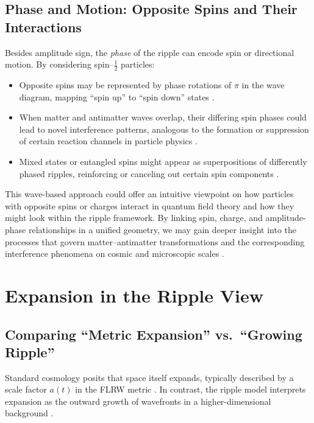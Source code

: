 \documentclass{article}
\begin{document}
\subsection{Phase and Motion: Opposite Spins and Their Interactions}
\label{subsec:phase-motion}
Besides amplitude sign, the \textit{phase} of the ripple can encode 
spin or directional motion. By considering spin--\(\tfrac{1}{2}\) 
particles:
\begin{itemize}
  \item Opposite spins may be represented by phase rotations of 
        \(\pi\) in the wave diagram, mapping ``spin up'' to ``spin down'' 
        states \cite{griffiths2005introduction, nielsenchuang2000}.
  \item When matter and antimatter waves overlap, their differing 
        spin phases could lead to novel interference patterns, 
        analogous to the formation or suppression of certain 
        reaction channels in particle physics \cite{Bell1964, hawking1988}.
  \item Mixed states or entangled spins might appear as superpositions 
        of differently phased ripples, reinforcing or canceling out 
        certain spin components \cite{everett1957, dewitt1971}.
\end{itemize}
This wave-based approach could offer an intuitive viewpoint on how 
particles with opposite spins or charges interact in quantum field 
theory and how they might look within the ripple framework. By linking 
spin, charge, and amplitude-phase relationships in a unified geometry, 
we may gain deeper insight into the processes that govern matter--antimatter 
transformations and the corresponding interference phenomena on cosmic 
and microscopic scales \cite{susskind2008, penrose2004}.
\section{Expansion in the Ripple View}
\label{sec:expansion-ripple}

\subsection{Comparing ``Metric Expansion'' vs.\ ``Growing Ripple''}
\label{subsec:metric-vs-ripple}
Standard cosmology posits that space itself expands, typically described by a scale factor \(a(t)\) in the FLRW metric \cite{rindler1977essential, misner1973}. In contrast, the ripple model interprets expansion as the outward growth of wavefronts in a higher-dimensional background \cite{penrose2004, susskind2008}. 
\end{document}
